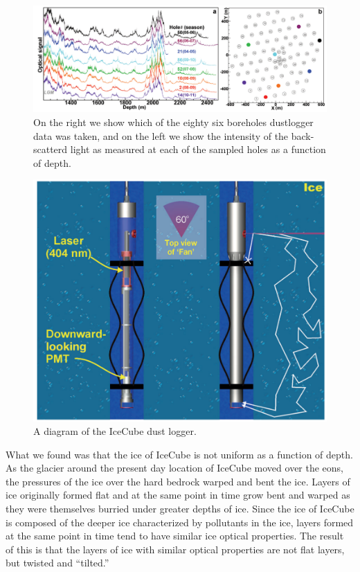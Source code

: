 \documentclass[main.tex]{subfiles}
\begin{document}
\begin{figure}  
    \centering
    \includegraphics[width=0.8\linewidth]{figures/tilt.png}
    \caption{On the right we show which of the eighty six boreholes dustlogger data was taken, and on the left we show the intensity of the back-scatterd light as measured at each of the sampled holes as a function of depth.}\label{fig:icetilt}
\end{figure}


\begin{figure}
    \centering
    \includegraphics[width=0.6\linewidth]{figures/dustlog.png}
    \caption{A diagram of the IceCube dust logger.}\label{fig:dustlog}
\end{figure}

What we found was that the ice of IceCube is not uniform as a function of depth.
As the glacier around the present day location of IceCube moved over the eons, the pressures of the ice over the hard bedrock warped and bent the ice.
Layers of ice originally formed flat and at the same point in time grow bent and warped as they were themselves burried under greater depths of ice. 
Since the ice of IceCube is composed of the deeper ice characterized by pollutants in the ice, layers formed at the same point in time tend to have similar ice optical properties. 
The result of this is that the layers of ice with similar optical properties are not flat layers, but twisted and ``tilted.''   
\end{document}
